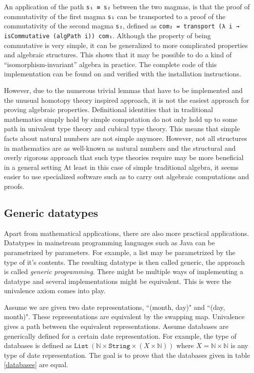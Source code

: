\documentclass[12pt,a4paper,twoside,xetex]{book}
\newcommand{\keyword}[1]{\emph{#1}\index{#1}}
\newcommand{\op}[1]{\mathtt{#1}}
\begin{document}
An application of the path \texttt{s₁ ≡ s₂} between the two magmas, is that the 
proof of commutativity of the first magma \texttt{s₁} can be transported to a 
proof of the commutativity of the second magma \texttt{s₂}, defined as 
\texttt{com₂ = transport (λ i → isCommutative (algPath i)) com₁}. Although the 
property of being commutative is very simple, it can be generalized to more 
complicated properties and algebraic structures. This shows that it may be 
possible to do a kind of ``isomorphism-invariant'' algebra in practice.  The 
complete code of this implementation can be found on \cite{Van19} and verified 
with the installation instructions.

However, due to the numerous trivial lemmas that have to be implemented and the 
unusual homotopy theory inspired approach, it is not the easiest approach for 
proving algebraic properties. Definitional identities that in traditional 
mathematics simply hold by simple computation do not only hold up to some path 
in univalent type theory and cubical type theory. This means that simple facts 
about natural numbers are not simple anymore. However, not all structures in 
mathematics are as well-known as natural numbers and the structural and overly 
rigorous approach that such type theories require may be more beneficial in a 
general setting At least in this case of simple traditional algebra, it seems 
easier to use specialized software such as \cite{TheGAPGroup2018} to carry out 
algebraic computations and proofs.


\subsection{Generic datatypes}

Apart from mathematical applications, there are also more practical 
applications. Datatypes in mainstream programming languages such as Java can be 
parametrized by parameters. For example, a list may be parametrized by the type 
of it's contents. The resulting datatype is then called generic, the approach 
is called \keyword{generic programming}. There might be multiple ways of 
implementing a datatype and several implementations might be equivalent. This 
is were the univalence axiom comes into play. 

Assume we are given two date representations, ``(month, day)" and ``(day, 
month)". These representations are equivalent by the swapping map. Univalence 
gives a path between the equivalent representations. Assume databases are 
generically defined for a certain date representation. For example, the type of 
databases is defined as $\op{List} \ (\mathbb{N} \times \op{String} \times (X 
\times \mathbb{N}))$ where $X = \mathbb{N} \times \mathbb{N}$ is any type of 
date representation. The goal is to prove that the databases given in table 
\ref{databases} are equal.
\end{document}
